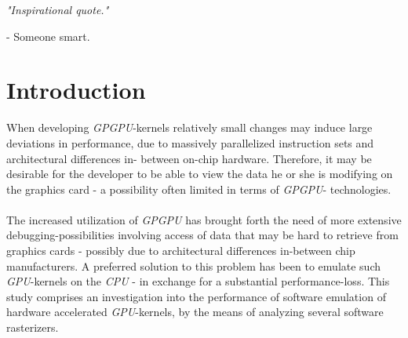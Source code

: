 \documentclass[fleqn,10pt]{SelfArx} %
\affiliation{EricNNilsson@gmail.com}
\newlength{\tocsep}
\begin{document}
\flushbottom %
\maketitle %

\noindent
\textit{"Inspirational quote."}
\begin{center}
- Someone smart.
\end{center}

\tableofcontents %
\thispagestyle{empty} %

\section*{Introduction} %
\label{sec:introduction}
When developing \textit{GPGPU}-kernels relatively small changes may induce large deviations in performance, due to massively parallelized instruction sets and architectural differences in-
between on-chip hardware. Therefore, it may be desirable for the developer to be able to view the data he or she is modifying on the graphics card - a possibility often limited in terms of \textit{GPGPU}-
technologies.\\
\\
The increased utilization of \textit{GPGPU} has brought forth the need of more extensive debugging-possibilities involving access of data that may be hard to retrieve from graphics cards - possibly due to architectural differences in-between chip manufacturers. A preferred solution to this problem has been to emulate such \textit{GPU}-kernels on the \textit{CPU} - in exchange for a substantial performance-loss. This study comprises an investigation into the performance of software emulation of hardware accelerated \textit{GPU}-kernels, by the means of analyzing several software rasterizers.\\
\end{document}
